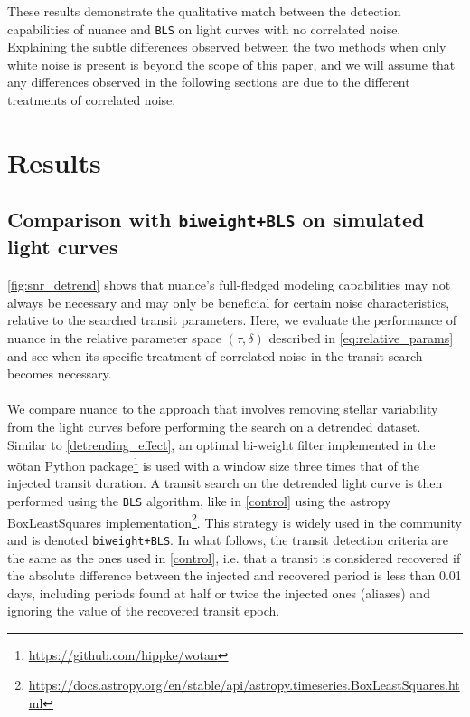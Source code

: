\documentclass{aastex631}
\newcommand{\footlink}[1]{\footnote{\url{#1}}}
\begin{document}
These results demonstrate the qualitative match between the detection capabilities of \textsf{nuance} and \texttt{BLS} on light curves with no correlated noise. Explaining the subtle differences observed between the two methods when only white noise is present is beyond the scope of this paper, and we will assume that any differences observed in the following sections are due to the different treatments of correlated noise.

\section{Results}\label{results}
\subsection{Comparison with \texttt{biweight+BLS} on simulated light curves}\label{simu}
\autoref{fig:snr_detrend} shows that \textsf{nuance}'s full-fledged modeling capabilities may not always be necessary and may only be beneficial for certain noise characteristics, relative to the searched transit parameters. Here, we evaluate the performance of \textsf{nuance} in the relative parameter space $(\tau, \delta)$ described in \autoref{eq:relative_params} and see when its specific treatment of correlated noise in the transit search becomes necessary.\\\\
We compare \textsf{nuance} to the approach that involves removing stellar variability from the light curves before performing the search on a detrended dataset. Similar to \autoref{detrending_effect}, an optimal bi-weight filter implemented in the \textsf{wõtan} Python package\footlink{https://github.com/hippke/wotan} is used with a window size three times that of the injected transit duration. A transit search on the detrended light curve is then performed using the \texttt{BLS} algorithm, like in \autoref{control} using the \textsf{astropy} \textsf{BoxLeastSquares} implementation\footlink{https://docs.astropy.org/en/stable/api/astropy.timeseries.BoxLeastSquares.html}. This strategy is widely used in the community and is denoted \texttt{biweight+BLS}. In what follows, the transit detection criteria are the same as the ones used in \autoref{control}, i.e. that a transit is considered recovered if the absolute difference between the injected and recovered period is less than 0.01 days, including periods found at half or twice the injected ones (aliases) and ignoring the value of the recovered transit epoch.
\end{document}
